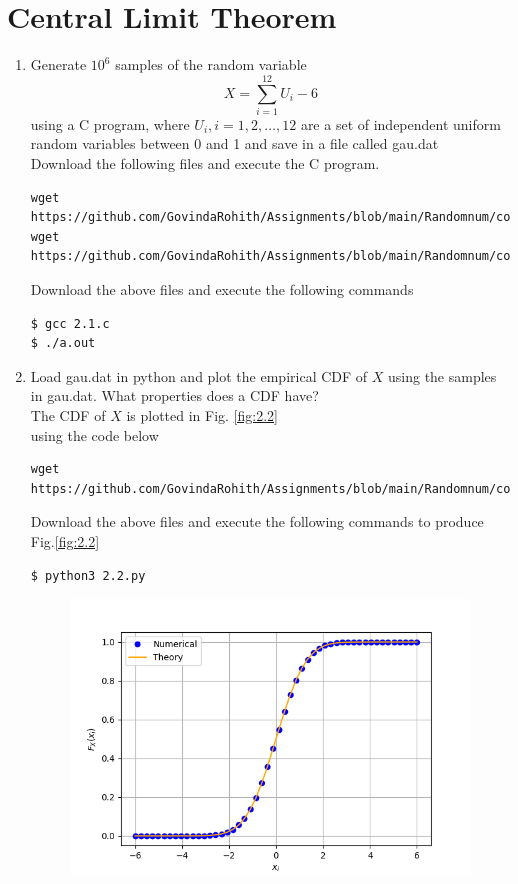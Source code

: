 \documentclass[journal,12pt,twocolumn]{IEEEtran}
\begin{document}
\section{Central Limit Theorem}
%
\begin{enumerate}[label=\thesection.\arabic*
,ref=\thesection.\theenumi]

%
\item
Generate $10^6$ samples of the random variable
%
\begin{equation}
X = \sum_{i=1}^{12}U_i -6
\end{equation}
%
using a C program, where $U_i, i = 1,2,\dots, 12$ are  a set of independent uniform random variables between 0 and 1 and save in a file called gau.dat\\
\solution Download the following files and execute the  C program.
\begin{lstlisting}
wget https://github.com/GovindaRohith/Assignments/blob/main/Randomnum/codes/2.1.c
wget https://github.com/GovindaRohith/Assignments/blob/main/Randomnum/codes/source.h
\end{lstlisting}
Download the above files and execute the following commands
\begin{lstlisting}
$ gcc 2.1.c
$ ./a.out
\end{lstlisting}
\item
Load gau.dat in python and plot the empirical CDF of $X$ using the samples in gau.dat. What properties does a CDF have?\\
\solution The CDF of $X$ is plotted in Fig. \ref{fig:2.2}\\
using the code below
\begin{lstlisting}
wget https://github.com/GovindaRohith/Assignments/blob/main/Randomnum/codes/2.2.py
\end{lstlisting}
Download the above files and execute the following commands to produce Fig.\ref{fig:2.2}
\begin{lstlisting}
$ python3 2.2.py
\end{lstlisting}
\begin{figure}[!h]
\centering
\includegraphics[width=\columnwidth]{./figs/2.2.png}

\end{figure}
\end{enumerate}
\end{document}
